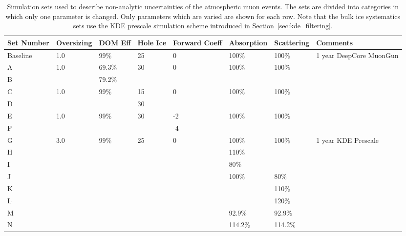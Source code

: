 \begin{landscape}
\begin{table}[]
\centering
\begin{tabular}{@{}llllllll@{}}
\toprule
Set Number & Oversizing & DOM Eff & Hole Ice & Forward Coeff & Absorption & Scattering & Comments                \\ \midrule
Baseline   & 1.0        & 99\%    & 25       & 0             & 100\%      & 100\%      & 1 year DeepCore MuonGun \\ \midrule
A          & 1.0        & 69.3\%  & 30       & 0             & 100\%      & 100\%      &                         \\
B          &            & 79.2\%  &          &               &            &            &                         \\ \midrule
C          & 1.0        & 99\%    & 15       & 0             & 100\%      & 100\%      &                         \\
D          &            &         & 30       &               &            &            &                         \\ \midrule
E          & 1.0        & 99\%    & 30       & -2            & 100\%      & 100\%      &                         \\
F          &            &         &          & -4            &            &            &                         \\ \midrule
G          & 3.0        & 99\%    & 25       & 0             & 100\%      & 100\%      & 1 year KDE Prescale     \\
H          &            &         &          &               & 110\%      &            &                         \\
I          &            &         &          &               & 80\%       &            &                         \\
J          &            &         &          &               & 100\%      & 80\%       &                         \\
K          &            &         &          &               &            & 110\%      &                         \\
L          &            &         &          &               &            & 120\%      &                         \\
M          &            &         &          &               & 92.9\%     & 92.9\%     &                         \\
N          &            &         &          &               & 114.2\%    & 114.2\%    &                         \\ \bottomrule
\end{tabular}
\caption[Available systematics sets for MuonGun]{Simulation sets used to describe non-analytic uncertainties of the atmospheric muon events. The sets are divided into categories in which only one parameter is changed. Only parameters which are varied are shown for each row. Note that the bulk ice systematics sets use the KDE prescale simulation scheme introduced in Section~\ref{sec:kde_filtering}.}
\label{table:mgsets}
\end{table}
\end{landscape}
